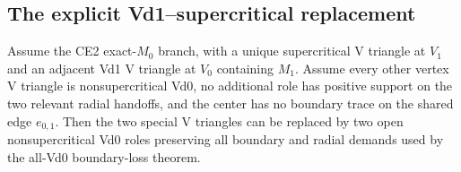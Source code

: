 \subsection{The explicit Vd1--supercritical replacement}

\begin{proposition}
\label{prop:paper-vd1-pair-replacement}
Assume the CE2 exact-$M_0$ branch, with a unique supercritical V triangle at $V_1$ and
an adjacent Vd1 V triangle at $V_0$ containing $M_1$.  Assume every other vertex V triangle
is nonsupercritical Vd0, no additional role has positive support on the two
relevant radial handoffs, and the center has no boundary trace on the shared
edge $e_{0,1}$.  Then the two special V triangles can be replaced by two open
nonsupercritical Vd0 roles preserving all boundary and radial demands used by
the all-Vd0 boundary-loss theorem.
\end{proposition}

